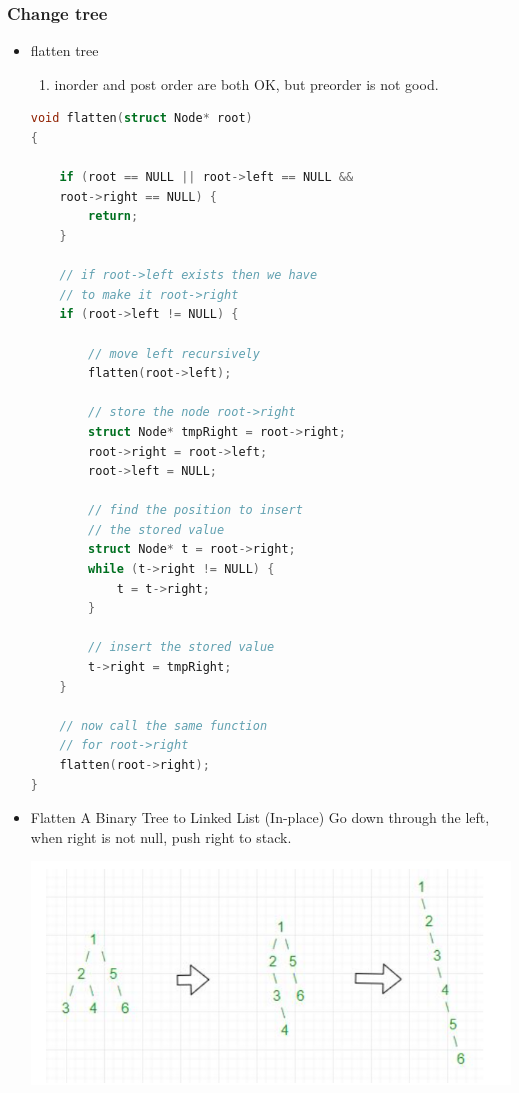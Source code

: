 \documentclass[a4paper,11pt,twoside]{book}
\begin{document}
\subsubsection{Change tree}
\begin{itemize}
	\item flatten tree
\begin{enumerate}
	\item inorder and post order are both OK, but preorder is not good.
\end{enumerate}
\begin{lstlisting}[frame=single, language=c++]	
void flatten(struct Node* root)
{
	
	if (root == NULL || root->left == NULL &&
	root->right == NULL) {
		return;
	}
	
	// if root->left exists then we have
	// to make it root->right
	if (root->left != NULL) {
		
		// move left recursively
		flatten(root->left);
		
		// store the node root->right
		struct Node* tmpRight = root->right;
		root->right = root->left;
		root->left = NULL;
		
		// find the position to insert
		// the stored value  
		struct Node* t = root->right;
		while (t->right != NULL) {
			t = t->right;
		}
		
		// insert the stored value
		t->right = tmpRight;
	}
	
	// now call the same function
	// for root->right
	flatten(root->right);
}
\end{lstlisting}

\item Flatten A Binary Tree to Linked List (In-place) 
Go down through the left, when right is not null, push right to stack. \newline

\includegraphics[scale=0.39]{pics/flat.png} \newline




\end{itemize}
\end{document}
